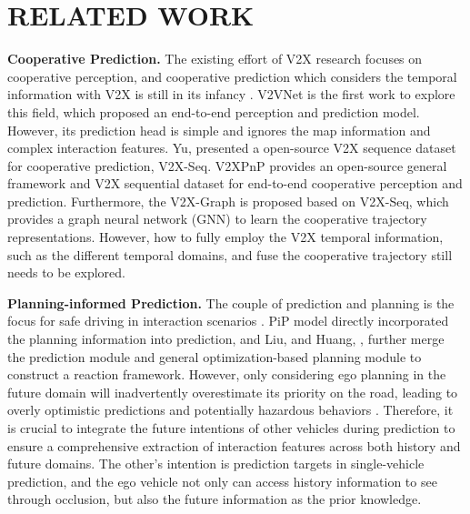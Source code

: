\section{RELATED WORK}
\noindent \textbf{Cooperative Prediction.} The existing effort of V2X research focuses on cooperative perception, and cooperative prediction which considers the temporal information with V2X is still in its infancy \cite{wu2024cmp, araluce2024enhancing, zhou2024v2xpnp}. V2VNet \cite{vedaldi_v2vnet_2020} is the first work to explore this field, which proposed an end-to-end perception and prediction model. However, its prediction head is simple and ignores the map information and complex interaction features. Yu, \etal \cite{yu2023v2x} presented a open-source V2X sequence dataset for cooperative prediction, V2X-Seq. V2XPnP \cite{zhou2024v2xpnp} provides an open-source general framework and V2X sequential dataset for end-to-end cooperative perception and prediction. Furthermore, the V2X-Graph \cite{ruan2023learning} is proposed based on V2X-Seq, which provides a graph neural network (GNN) to learn the cooperative trajectory representations. However, how to fully employ the V2X temporal information, such as the different temporal domains, and fuse the cooperative trajectory still needs to be explored.

\noindent \textbf{Planning-informed Prediction.} The couple of prediction and planning is the focus for safe driving in interaction scenarios \cite{hu2023planning, espinoza2022deep}. PiP model \cite{song2020pip} directly incorporated the planning information into prediction, and Liu, \etal \cite{liu2021deep} and Huang, \etal \cite{huang2023differentiable}, further merge the prediction module and general optimization-based  planning module \cite{bhardwaj2020differentiable, zhou2021reliable} to construct a reaction framework. However, only considering ego planning in the future domain will inadvertently overestimate its priority on the road, leading to overly optimistic predictions and potentially hazardous behaviors \cite{tang2022interventional}. Therefore, it is crucial to integrate the future intentions of other vehicles during prediction to ensure a comprehensive extraction of interaction features across both history and future domains. The other's intention is prediction targets in single-vehicle prediction, and the ego vehicle not only can access history information to see through occlusion, but also the future information as the prior knowledge.


